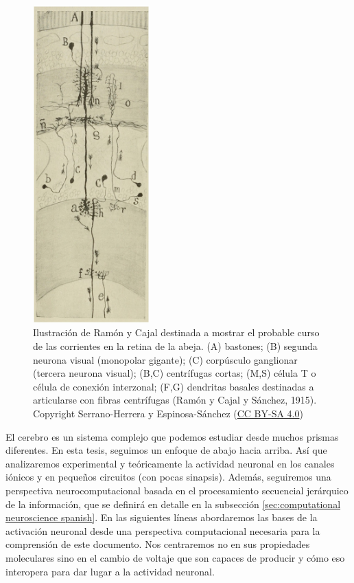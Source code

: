 \begin{figure}[htb!]
    \centering
    \includegraphics[width=0.4\textwidth]{img/intro/cajal-flow.jpg}
    \caption{Ilustración de Ramón y Cajal destinada a mostrar el probable curso de las corrientes en la retina de la abeja. (A) bastones; (B) segunda neurona visual (monopolar gigante); (C) corpúsculo ganglionar (tercera neurona visual); (B,C) centrífugas cortas; (M,S) célula T o célula de conexión interzonal; (F,G) dendritas basales destinadas a articularse con fibras centrífugas (Ramón y Cajal y Sánchez, 1915). Copyright Serrano-Herrera y Espinosa-Sánchez \cite{serrano-herrera_domingo_2024} (\href{https://creativecommons.org/licenses/by-sa/4.0/}{CC BY-SA 4.0})}
    \label{cajal-neuron}
\end{figure}

El cerebro es un sistema complejo que podemos estudiar desde muchos prismas diferentes. En esta tesis, seguimos un enfoque de abajo hacia arriba. Así que analizaremos experimental y teóricamente la actividad neuronal en los canales iónicos y en pequeños circuitos (con pocas sinapsis). Además, seguiremos una perspectiva neurocomputacional basada en el procesamiento secuencial jerárquico de la información, que se definirá en detalle en la subsección \ref{sec:computational neuroscience spanish}. En las siguientes líneas abordaremos las bases de la activación neuronal desde una perspectiva computacional necesaria para la comprensión de este documento. Nos centraremos no en sus propiedades moleculares sino en el cambio de voltaje que son capaces de producir y cómo eso interopera para dar lugar a la actividad neuronal.


